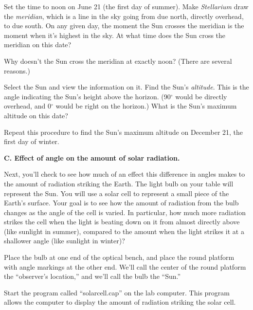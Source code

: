 
\medskip


Set the time to noon on June 21 (the first day of summer).
Make \textit{Stellarium} draw the \textit{meridian}, which is a line 
in the sky going from due north, directly overhead, to due south.
On any given day,
the moment the Sun crosses the meridian is the moment when it's
highest in the sky.  
At what time does the Sun cross the
meridian on this date?

\answerspace{1in}

Why doesn't the Sun cross the meridian at exactly noon?  (There
are several reasons.)

\answerspace{1.5in}

Select the Sun and view the information on it. Find the
Sun's \textit{altitude}.
This is the angle indicating the Sun's height above
the horizon. (90$^\circ$ would be directly overhead,
and 0$^\circ$ would be right on the horizon.)  What is the Sun's
maximum altitude on this date?

\answerspace{1in}

Repeat this procedure to find the Sun's maximum altitude on 
December 21, the first day of winter.

\answerspace{1in}



{\bf C. Effect of angle on the amount of solar radiation.}

\medskip

Next, you'll check to see how much of an effect this difference in angles
makes to the amount of radiation striking the Earth.  The light
bulb on your table will represent the Sun.  You will use a solar
cell to represent a small piece of the Earth's surface.
Your goal is to see how the
amount of radiation from the bulb changes as the
angle of the cell is varied. In particular, how much more radiation strikes
the cell when the light is beating down on it from almost directly above
(like sunlight in summer),
compared to the amount when the light strikes it at a shallower angle
(like sunlight in winter)?

Place the bulb at one end of the optical bench, and place
the round platform with angle markings at the other end.
We'll call the center of the round platform
the ``observer's location,'' and we'll call the bulb the ``Sun.''

Start the program called 
``solarcell.cap'' on the lab computer.  
This program allows the computer to display the amount of radiation striking
the solar cell.

